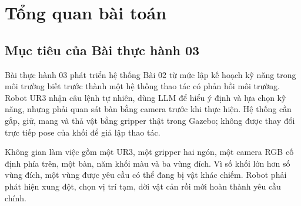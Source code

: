 \documentclass[a4paper,12pt]{article}
\begin{document}
\section{Tổng quan bài toán}

\subsection{Mục tiêu của Bài thực hành 03}
Bài thực hành 03 phát triển hệ thống Bài 02 từ mức lập kế hoạch kỹ năng trong
môi trường biết trước thành một hệ thống thao tác có phản hồi môi trường. Robot
UR3 nhận câu lệnh tự nhiên, dùng LLM để hiểu ý định và lựa chọn kỹ năng, nhưng
phải quan sát bàn bằng camera trước khi thực hiện. Hệ thống cần gắp, giữ, mang và
thả vật bằng gripper thật trong Gazebo; không được thay đổi trực tiếp pose của
khối để giả lập thao tác.

Không gian làm việc gồm một UR3, một gripper hai ngón, một camera RGB cố định
phía trên, một bàn, năm khối màu và ba vùng đích. Vì số khối lớn hơn số vùng
đích, một vùng được yêu cầu có thể đang bị vật khác chiếm. Robot phải phát hiện
xung đột, chọn vị trí tạm, dời vật cản rồi mới hoàn thành yêu cầu chính.
\end{document}

